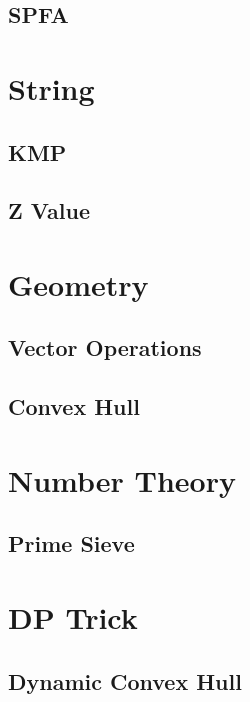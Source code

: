 \documentclass[twocolumn]{article}
\begin{document}
\subsection{SPFA}


\section{String}

\subsection{KMP}


\subsection{Z Value}


\section{Geometry}

\subsection{Vector Operations}


\subsection{Convex Hull}


\section{Number Theory}

\subsection{Prime Sieve}


\section{DP Trick}

\subsection{Dynamic Convex Hull}

\end{document}
